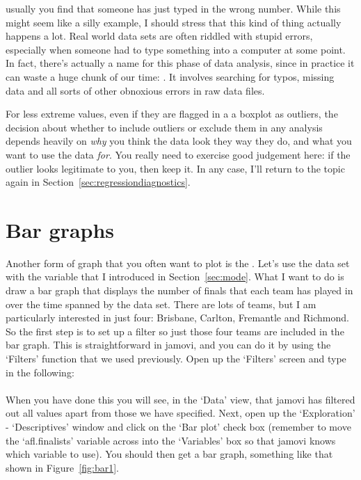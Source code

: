 usually you find that someone has just typed in the wrong number. While this might seem like a silly example, I should stress that this kind of thing actually happens a lot. Real world data sets are often riddled with stupid errors, especially when someone had to type something into a computer at some point. In fact, there's actually a name for this phase of data analysis, since in practice it can waste a huge chunk of our time: . It involves searching for typos, missing data and all sorts of other obnoxious errors in raw data files.

For less extreme values, even if they are flagged in a a boxplot as outliers, the decision about whether to include outliers or exclude them in any analysis depends heavily on {\it why} you think the data look they way they do, and what you want to use the data {\it for}. You really need to exercise good judgement here: if the outlier looks legitimate to you, then keep it. In any case, I'll return to the topic again in Section~\ref{sec:regressiondiagnostics}. 



\section{Bar graphs\label{sec:bargraph}}

Another form of graph that you often want to plot is the . Let's use the  data set with the  variable that I introduced in Section~\ref{sec:mode}. What I want to do is draw a bar graph that displays the number of finals that each team has played in over the time spanned by the  data set. There are lots of teams, but I am particularly interested in just four: Brisbane, Carlton, Fremantle and Richmond. So the first step is to set up a filter so just those four teams are included in the bar graph. This is straightforward in jamovi, and you can do it by using the `Filters' function that we used previously. Open up the `Filters' screen and type in the following: \\

\noindent
{} \\

When you have done this you will see, in the `Data' view, that jamovi has filtered out all values apart from those we have specified. Next, open up the `Exploration' - `Descriptives' window and click on the `Bar plot' check box (remember to move the `afl.finalists' variable across into the `Variables' box so that jamovi knows which variable to use). You should then get a bar graph, something like that shown in Figure~\ref{fig:bar1}.

